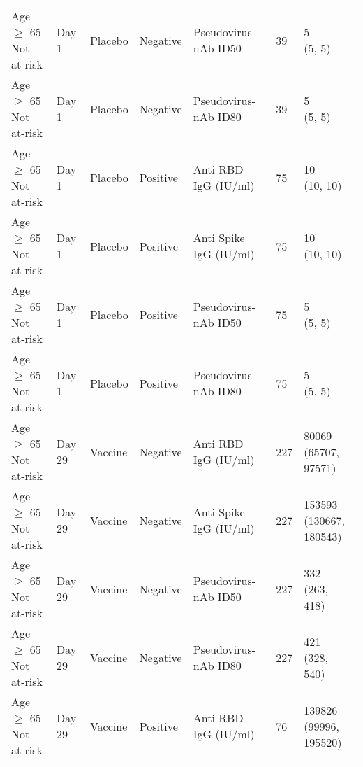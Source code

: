 \documentclass[]{book}
\theoremstyle{definition}
\theoremstyle{definition}
\theoremstyle{definition}
\newcommand{\1}{\mathbbm{1}}
\begin{document}
\begin{landscape}
\begin{ThreePartTable}
\begin{longtable}[t]{>{\raggedright\arraybackslash}p{7cm}llllll}
\hspace{1em}Age $\geq$ 65 Not at-risk & Day 1 & Placebo & Negative & Pseudovirus-nAb ID50 & 39 & \makecell[l]{5\\(5, 5)}\\
\hspace{1em}Age $\geq$ 65 Not at-risk & Day 1 & Placebo & Negative & Pseudovirus-nAb ID80 & 39 & \makecell[l]{5\\(5, 5)}\\
\hspace{1em}Age $\geq$ 65 Not at-risk & Day 1 & Placebo & Positive & Anti RBD IgG (IU/ml) & 75 & \makecell[l]{10\\(10, 10)}\\
\hspace{1em}Age $\geq$ 65 Not at-risk & Day 1 & Placebo & Positive & Anti Spike IgG (IU/ml) & 75 & \makecell[l]{10\\(10, 10)}\\
\hspace{1em}Age $\geq$ 65 Not at-risk & Day 1 & Placebo & Positive & Pseudovirus-nAb ID50 & 75 & \makecell[l]{5\\(5, 5)}\\
\hspace{1em}Age $\geq$ 65 Not at-risk & Day 1 & Placebo & Positive & Pseudovirus-nAb ID80 & 75 & \makecell[l]{5\\(5, 5)}\\
\hspace{1em}Age $\geq$ 65 Not at-risk & Day 29 & Vaccine & Negative & Anti RBD IgG (IU/ml) & 227 & \makecell[l]{80069\\(65707, 97571)}\\
\hspace{1em}Age $\geq$ 65 Not at-risk & Day 29 & Vaccine & Negative & Anti Spike IgG (IU/ml) & 227 & \makecell[l]{153593\\(130667, 180543)}\\
\hspace{1em}Age $\geq$ 65 Not at-risk & Day 29 & Vaccine & Negative & Pseudovirus-nAb ID50 & 227 & \makecell[l]{332\\(263, 418)}\\
\hspace{1em}Age $\geq$ 65 Not at-risk & Day 29 & Vaccine & Negative & Pseudovirus-nAb ID80 & 227 & \makecell[l]{421\\(328, 540)}\\
\hspace{1em}Age $\geq$ 65 Not at-risk & Day 29 & Vaccine & Positive & Anti RBD IgG (IU/ml) & 76 & \makecell[l]{139826\\(99996, 195520)}\\

\end{longtable}
\end{ThreePartTable}
\end{landscape}
\end{document}
